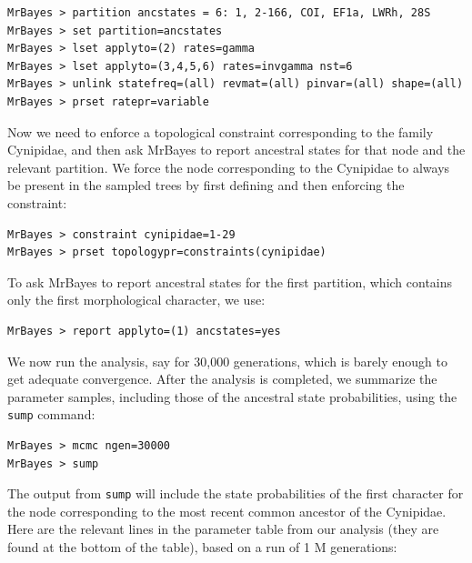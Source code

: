 \documentclass[12pt]{book}
\newcommand{\ttt}[1]{\texttt{#1}}
\begin{document}
\small
\begin{singlespacing}
\begin{verbatim}
MrBayes > partition ancstates = 6: 1, 2-166, COI, EF1a, LWRh, 28S
MrBayes > set partition=ancstates
MrBayes > lset applyto=(2) rates=gamma
MrBayes > lset applyto=(3,4,5,6) rates=invgamma nst=6
MrBayes > unlink statefreq=(all) revmat=(all) pinvar=(all) shape=(all)
MrBayes > prset ratepr=variable
\end{verbatim}
\end{singlespacing}
\normalsize

Now we need to enforce a topological constraint corresponding to the family Cynipidae, and then ask
MrBayes to report ancestral states for that node and the relevant partition. We force the node
corresponding to the Cynipidae to always be present in the sampled trees by first defining and then
enforcing the constraint:

\small
\begin{singlespacing}
\begin{verbatim}
MrBayes > constraint cynipidae=1-29
MrBayes > prset topologypr=constraints(cynipidae)
\end{verbatim}
\end{singlespacing}
\normalsize

To ask MrBayes to report ancestral states for the first partition, which contains only the first
morphological character, we use:

\small
\begin{singlespacing}
\begin{verbatim}
MrBayes > report applyto=(1) ancstates=yes
\end{verbatim}
\end{singlespacing}
\normalsize

We now run the analysis, say for 30,000 generations, which is barely enough to get adequate
convergence. After the analysis is completed, we summarize the parameter samples, including those
of the ancestral state probabilities, using the \ttt{sump} command:

\small
\begin{singlespacing}
\begin{verbatim}
MrBayes > mcmc ngen=30000
MrBayes > sump
\end{verbatim}
\end{singlespacing}
\normalsize

The output from \ttt{sump} will include the state probabilities of the first character for the node
corresponding to the most recent common ancestor of the Cynipidae. Here are the relevant lines in
the parameter table from our analysis (they are found at the bottom of the table), based on a run
of 1 M generations:
\end{document}
